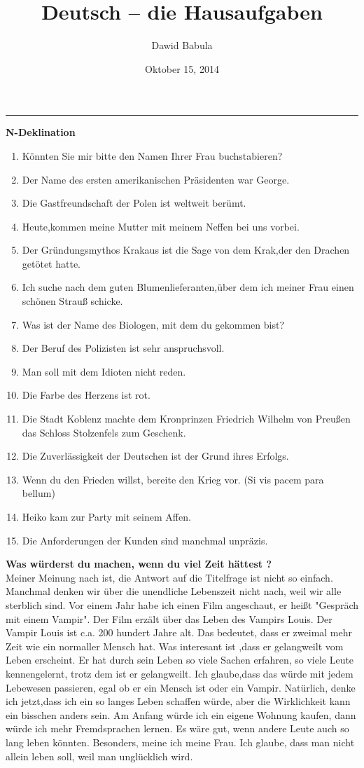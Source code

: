 \documentclass[a4paper,12pt]{article}
\author{Dawid Babula}
\title{Deutsch -- die Hausaufgaben}
\date{Oktober 15, 2014}
\makeatletter
\def\thickhrulefill{\leavevmode \leaders \hrule height 1pt\hfill \kern \z@}
\def\maketitle{%
    \null
    \thispagestyle{empty}%
    \vfill
    \begin{center}\leavevmode
    \normalfont
    {\LARGE\raggedleft \@author\par}%
    \thickhrulefill\par
    {\huge\raggedright \@title\par}%
    \vskip 1cm
    \end{center}%
    \vfill
    {\Large \@date\par}%
    \null
    \cleardoublepage
    }
\makeatother
\begin{document}
\maketitle

\textbf{\large N-Deklination}
\vspace{2pc}
\begin{enumerate}
    \item K\"onnten Sie mir bitte den Namen Ihrer Frau buchstabieren?
    \item Der Name des ersten amerikanischen Pr\"asidenten war George.
    \item Die Gastfreundschaft der Polen ist weltweit ber\"umt.
    \item Heute,kommen meine Mutter mit meinem Neffen bei uns vorbei.
    \item Der Gr\"undungsmythos Krakaus ist die Sage von dem Krak,der den Drachen get\"otet hatte.
    \item Ich suche nach dem guten Blumenlieferanten,\"uber dem ich meiner Frau einen sch\"onen Strau{\ss} schicke.
    \item Was ist der Name des Biologen, mit dem du gekommen bist?
    \item Der Beruf des Polizisten ist sehr anspruchsvoll.
    \item Man soll mit dem Idioten nicht reden.
    \item Die Farbe des Herzens ist rot.
    \item Die Stadt Koblenz machte dem Kronprinzen Friedrich Wilhelm von Preu{\ss}en das Schloss Stolzenfels zum Geschenk.
    \item Die Zuverl\"assigkeit der Deutschen ist der Grund ihres Erfolgs.
    \item Wenn du den Frieden willst, bereite den Krieg vor. (Si vis pacem para bellum)
    \item Heiko kam zur Party mit seinem Affen.
    \item Die Anforderungen der Kunden sind manchmal unpr\"azis.
\end{enumerate}
\newpage
\textbf{\large Was w\"urderst du machen, wenn du viel Zeit h\"attest ?}
\vspace{2pc}
\\{}
Meiner Meinung nach ist, die Antwort auf die Titelfrage ist nicht so einfach. Manchmal denken wir \"uber die unendliche Lebenszeit nicht nach, weil wir alle sterblich sind.
Vor einem Jahr habe ich einen Film angeschaut, er hei{\ss}t "Gespr\"ach mit einem Vampir". Der Film erz\"alt \"uber das Leben des Vampirs Louis. Der Vampir Louis ist
c.a. 200 hundert Jahre alt. Das bedeutet, dass er zweimal mehr Zeit wie ein normaller Mensch hat. Was interesant ist ,dass er gelangweilt vom Leben erscheint.
Er hat durch sein Leben so viele Sachen erfahren, so viele Leute kennengelernt, trotz dem ist er gelangweilt. Ich glaube,dass das w\"urde mit jedem Lebewesen passieren, egal ob
er ein Mensch ist oder ein Vampir. Nat\"urlich, denke ich jetzt,dass ich ein so langes Leben schaffen w\"urde, aber die Wirklichkeit kann ein bisschen anders sein.
Am Anfang w\"urde ich ein eigene Wohnung kaufen, dann w\"urde ich mehr Fremdsprachen lernen. Es w\"are gut, wenn andere Leute auch so lang leben k\"onnten. Besonders, meine ich meine
Frau. Ich glaube, dass man nicht allein leben soll, weil man ungl\"ucklich wird.
\end{document}
